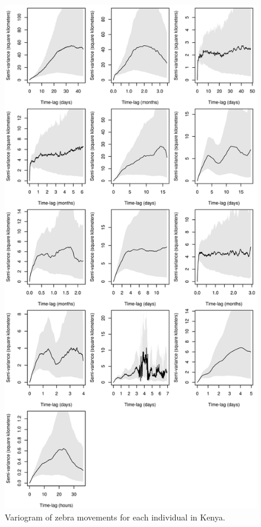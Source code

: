 \documentclass[12pt,a4paper, twoside, english]{article}
\begin{document}

\begin{figure}[H]
  \centering
  \includegraphics[height=0.97\textheight]{figures/Zebra_Vario_KEN.png}
  \caption[Variogram of Laikipia zebras]{Variogram of zebra movements for each individual in Kenya.}
  \label{fig:vario_ken}
\end{figure}
\end{document}
